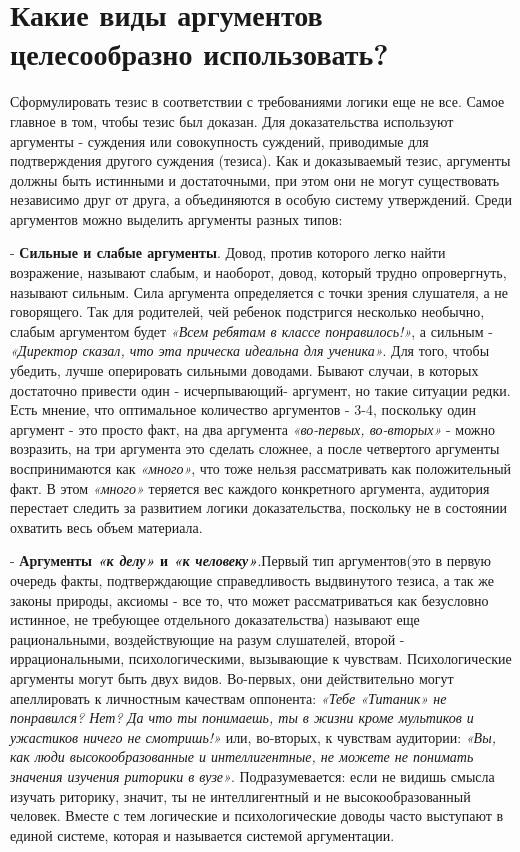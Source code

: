     \chapter{\textbf{Какие виды аргументов целесообразно использовать?} } 
	Сформулировать тезис в соответствии с требованиями логики еще не все. Самое главное в том, чтобы тезис был доказан. Для доказательства используют аргументы - суждения или совокупность суждений, приводимые для подтверждения другого суждения (тезиса). Как и доказываемый тезис, аргументы должны быть истинными и достаточными, при этом они не могут существовать независимо друг от друга, а объединяются в особую систему утверждений. Среди аргументов можно выделить аргументы разных типов:

- \textbf{Сильные и слабые аргументы}. Довод, против которого легко найти возражение, называют слабым, и наоборот, довод, который трудно опровергнуть, называют сильным. Сила аргумента определяется с точки зрения слушателя, а не говорящего. Так для родителей, чей ребенок подстригся несколько необычно, слабым аргументом будет \textit{«Всем ребятам в классе понравилось!»}, а сильным - \textit{«Директор сказал, что эта прическа идеальна для ученика»}. Для того, чтобы убедить, лучше оперировать сильными доводами. Бывают случаи, в которых достаточно привести один - исчерпывающий- аргумент, но такие ситуации редки. Есть мнение, что оптимальное количество аргументов - 3-4, поскольку один аргумент - это просто факт, на два аргумента \textit{«во-первых, во-вторых»} - можно возразить, на три аргумента это сделать сложнее, а после четвертого аргументы воспринимаются как \textit{«много»}, что тоже нельзя рассматривать как положительный факт. В этом \textit{«много»} теряется вес каждого конкретного аргумента, аудитория перестает следить за развитием логики доказательства, поскольку не в состоянии охватить весь объем материала.

- \textbf{Аргументы \textit{«к делу»} и \textit{«к человеку»}}.Первый тип аргументов(это в первую очередь факты, подтверждающие справедливость выдвинутого тезиса, а так же законы природы, аксиомы - все то, что может рассматриваться как безусловно истинное, не требующее отдельного доказательства) называют еще рациональными, воздействующие на разум слушателей, второй - иррациональными, психологическими, вызывающие к чувствам. Психологические аргументы могут быть двух видов. Во-первых, они действительно могут апеллировать к личностным качествам оппонента: \textit{«Тебе «Титаник» не понравился? Нет? Да что ты понимаешь, ты в жизни кроме мультиков и ужастиков ничего не смотришь!»} или, во-вторых, к чувствам аудитории:   \textit{«Вы, как люди высокообразованные и интеллигентные, не можете не понимать значения изучения риторики в вузе»}. Подразумевается: если не видишь смысла изучать риторику, значит, ты не интеллигентный и не высокообразованный человек. Вместе с тем логические и психологические доводы часто выступают в единой системе, которая и называется системой аргументации.

